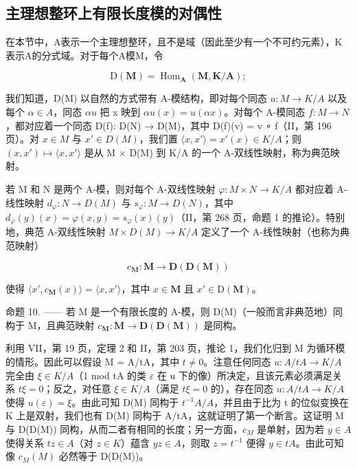 \subsection{主理想整环上有限长度模的对偶性}

在本节中，A表示一个主理想整环，且不是域（因此至少有一个不可约元素），K表示A的分式域。对于每个A模M，令

\[
\mathrm{D} (\mathbf {M}) = \operatorname{Hom} _ {\mathbf {A}} (\mathbf {M}, \mathbf {K} / \mathbf {A});
\]

我们知道，D(M) 以自然的方式带有 A-模结构，即对每个同态 \(u: M \to K/A\) 以及每个 \(\alpha \in A\)，同态 \(\alpha u\) 把 x 映到 \(\alpha u(x) = u(\alpha x)\)。对每个 A-模同态 \(f: M \to N\)，都对应着一个同态 D(f): D(N) → D(M)，其中 D(f)(v) = v ∘ f（II，第 196 页）。对 \(x \in M\) 与 \(x' \in D(M)\)，我们置 \(\langle x, x' \rangle = x'(x) \in K/A\)；则 \((x, x') \mapsto \langle x, x' \rangle\) 是从 M × D(M) 到 K/A 的一个 A-双线性映射，称为典范映射。

若 M 和 N 是两个 A-模，则对每个 A-双线性映射 \(\varphi: M \times N \to K/A\) 都对应着 A-线性映射 \(d_{\varphi}: N \to D(M)\) 与 \(s_{\varphi}: M \to D(N)\)，其中 \(d_{\varphi}(y)(x) = \varphi(x, y) = s_{\varphi}(x)(y)\)（II，第 268 页，命题 1 的推论）。特别地，典范 A-双线性映射 \(M \times D(M) \to K/A\) 定义了一个 A-线性映射（也称为典范映射）

\[
c _ {\mathbf {M}}: \mathbf {M} \rightarrow \mathbf {D} (\mathbf {D} (\mathbf {M}))
\]

使得 \(\langle x', c_{\mathbf{M}}(x) \rangle = \langle x, x' \rangle\)，其中 \(x \in \mathbf{M}\) 且 \(x' \in \mathrm{D}(\mathbf{M})\)。

命题 10. —— 若 M 是一个有限长度的 A-模，则 D(M)（一般而言非典范地）同构于 M，且典范映射 \(c_{\mathbf{M}}: \mathbf{M} \to \mathbf{D}(\mathbf{D}(\mathbf{M}))\) 是同构。

利用 VII，第 19 页，定理 2 和 II，第 203 页，推论 1，我们化归到 M 为循环模的情形。因此可以假设 M = A/tA，其中 \(t \neq 0\)。注意任何同态 \(u: A/tA \to K/A\) 完全由 \(\xi \in K/A\)（1 mod tA 的类 \(\varepsilon\) 在 u 下的像）所决定，且该元素必须满足关系 \(t\xi = 0\)；反之，对任意 \(\xi \in K/A\)（满足 \(t\xi = 0\) 的），存在同态 \(u: A/tA \to K/A\) 使得 \(u(\varepsilon) = \xi\)。由此可知 D(M) 同构于 \(t^{-1}A/A\)，并且由于比为 t 的位似变换在 K 上是双射，我们也有 D(M) 同构于 A/tA，这就证明了第一个断言。这证明 M 与 D(D(M)) 同构，从而二者有相同的长度；另一方面，\(c_{M}\) 是单射，因为若 \(y \in A\) 使得关系 \(tz \in A\)（对 \(z \in K\)）蕴含 \(yz \in A\)，则取 \(z = t^{-1}\) 便得 \(y \in tA\)。由此可知像 \(c_{M}(M)\) 必然等于 D(D(M))。

